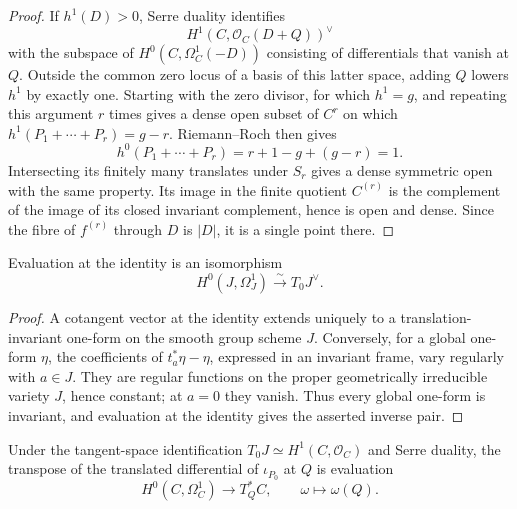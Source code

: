 \begin{proof}
  If \(h^1(D)>0\), Serre duality identifies
  \[
    H^1(C,\mathcal O_C(D+Q))^\vee
  \]
  with the subspace of \(H^0(C,\Omega_C^1(-D))\) consisting of
  differentials that vanish at \(Q\).  Outside the common zero locus of a
  basis of this latter space,
  adding \(Q\) lowers \(h^1\) by exactly one.  Starting with the zero
  divisor, for which \(h^1=g\), and repeating this argument \(r\) times
  gives a dense open subset of \(C^r\) on which
  \(h^1(P_1+\cdots+P_r)=g-r\).  Riemann--Roch then gives
  \[
    h^0(P_1+\cdots+P_r)
      =r+1-g+(g-r)=1.
  \]
  Intersecting its finitely many translates under \(S_r\) gives a dense
  symmetric open with the same property.  Its image in the finite quotient
  \(C^{(r)}\) is the complement of the image of its closed invariant
  complement, hence is open and dense.
  Since the fibre of \(f^{(r)}\) through \(D\) is \(|D|\), it is a single
  point there.
\end{proof}

\begin{lemma}
  \label{lem:jacobian_invariant_one_forms}

  Evaluation at the identity is an isomorphism
  \[
    H^0(J,\Omega_J^1)\xrightarrow{\sim}T_0J^\vee.
  \]
\end{lemma}

\begin{proof}
  A cotangent vector at the identity extends uniquely to a
  translation-invariant one-form on the smooth group scheme \(J\).
  Conversely, for a global one-form \(\eta\), the coefficients of
  \(t_a^*\eta-\eta\), expressed in an invariant frame, vary regularly with
  \(a\in J\).  They are regular functions on the proper geometrically
  irreducible variety \(J\), hence constant; at \(a=0\) they vanish.  Thus
  every global one-form is invariant, and evaluation at the identity gives
  the asserted inverse pair.
\end{proof}

\begin{lemma}
  \label{lem:abel_jacobi_differential}

  Under the tangent-space identification
  \(T_0J\simeq H^1(C,\mathcal O_C)\) and Serre duality, the transpose of the
  translated differential of \(\iota_{P_0}\) at \(Q\) is evaluation
  \[
    H^0(C,\Omega_C^1)\longrightarrow T_Q^*C,
    \qquad \omega\longmapsto\omega(Q).
  \]
\end{lemma}

